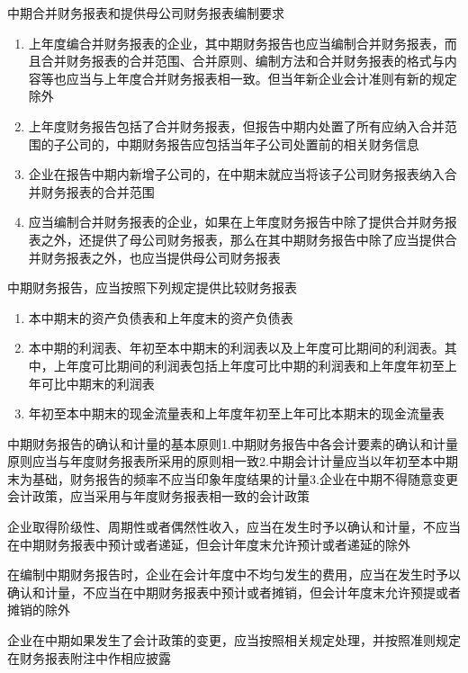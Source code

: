 \documentclass[UTF8,12pt]{ctexart}
\numberwithin{equation}{section} %
\numberwithin{figure}{section}
\numberwithin{table}{section}
\begin{document}
	中期合并财务报表和提供母公司财务报表编制要求
	\begin{enumerate}
		\item 上年度编合并财务报表的企业，其中期财务报告也应当编制合并财务报表，而且合并财务报表的合并范围、合并原则、编制方法和合并财务报表的格式与内容等也应当与上年度合并财务报表相一致。但当年新企业会计准则有新的规定除外
		
		\item 上年度财务报告包括了合并财务报表，但报告中期内处置了所有应纳入合并范围的子公司的，中期财务报告应包括当年子公司处置前的相关财务信息
		
		\item 企业在报告中期内新增子公司的，在中期末就应当将该子公司财务报表纳入合并财务报表的合并范围
		
		\item 应当编制合并财务报表的企业，如果在上年度财务报告中除了提供合并财务报表之外，还提供了母公司财务报表，那么在其中期财务报告中除了应当提供合并财务报表之外，也应当提供母公司财务报表
	\end{enumerate}
	
	中期财务报告，应当按照下列规定提供比较财务报表
	\begin{enumerate}
		\item 本中期末的资产负债表和上年度末的资产负债表
		
		\item 本中期的利润表、年初至本中期末的利润表以及上年度可比期间的利润表。其中，上年度可比期间的利润表包括上年度可比中期的利润表和上年度年初至上年可比中期末的利润表
		
		\item 年初至本中期末的现金流量表和上年度年初至上年可比本期末的现金流量表
	\end{enumerate}
	
	中期财务报告的确认和计量的基本原则1.中期财务报告中各会计要素的确认和计量原则应当与年度财务报表所采用的原则相一致2.中期会计计量应当以年初至本中期末为基础，财务报告的频率不应当印象年度结果的计量3.企业在中期不得随意变更会计政策，应当采用与年度财务报表相一致的会计政策
	
	企业取得阶级性、周期性或者偶然性收入，应当在发生时予以确认和计量，不应当在中期财务报表中预计或者递延，但会计年度末允许预计或者递延的除外
	
	在编制中期财务报告时，企业在会计年度中不均匀发生的费用，应当在发生时予以确认和计量，不应当在中期财务报表中预计或者摊销，但会计年度末允许预提或者摊销的除外
	
	企业在中期如果发生了会计政策的变更，应当按照相关规定处理，并按照准则规定在财务报表附注中作相应披露
	
\end{document}
